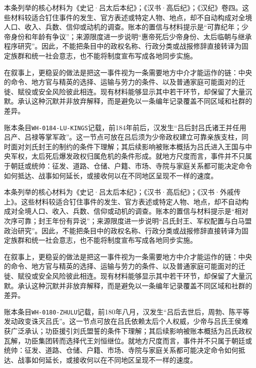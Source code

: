 本条列举的核心材料为《史记·吕太后本纪》；《汉书·高后纪》；《汉纪》卷四。这些材料较适合钉住事件的发生、官方表述或特定人物、地点，却不自动构成对全境人口、收入、兵数、信仰或动机的调查。账本的置信与材料提示是“可靠纪年；少帝身份和年龄有争议”；来源限度进一步说明“惠帝死后少帝身份、太后临朝与继承程序研究”。因此，不能把条目中的政权名称、行政分类或战报修辞直接转译为固定族群和统一社会意志，也不能将制度宣布写成各地同步实施。

在叙事上，更稳妥的做法是把这一事件视为一条需要地方中介才能运作的链：中央的命令、地方官与精英的选择、运输与劳力的条件、以及普通家庭可能面对的迁徙、赋役或安全风险彼此相连。现有材料能够显示其中若干环节，却保留了大量沉默。承认这种沉默并非放弃解释，而是避免以一条编年记录覆盖不同区域和社群的差异。

账本条目\texttt{WH-0184-LU-KINGS}记载，前184年前后，汉发生“吕后封吕氏诸王并任用吕产、吕禄等掌军政”。这一节点可放在吕后须为少帝政权建立可靠亲族支柱，同时面对刘氏封王的制约的条件下理解；其后续影响被账本概括为吕氏进入王国与中央军权，太后死后爆发政权归属危机的条件形成。就地方尺度而言，事件并不只属于朝廷或统帅：征发、道路、仓储、户籍、市场、寺院与家庭关系都可能决定命令如何抵达、战事如何延长，或接收何以在不同地区呈现不一样的速度。

本条列举的核心材料为《史记·吕太后本纪》；《汉书·高后纪》；《汉书·外戚传上》。这些材料较适合钉住事件的发生、官方表述或特定人物、地点，却不自动构成对全境人口、收入、兵数、信仰或动机的调查。账本的置信与材料提示是“相对次序可靠；封王年份有异说”；来源限度进一步说明“吕氏封王、军权配置与白马盟政治研究”。因此，不能把条目中的政权名称、行政分类或战报修辞直接转译为固定族群和统一社会意志，也不能将制度宣布写成各地同步实施。

在叙事上，更稳妥的做法是把这一事件视为一条需要地方中介才能运作的链：中央的命令、地方官与精英的选择、运输与劳力的条件、以及普通家庭可能面对的迁徙、赋役或安全风险彼此相连。现有材料能够显示其中若干环节，却保留了大量沉默。承认这种沉默并非放弃解释，而是避免以一条编年记录覆盖不同区域和社群的差异。

账本条目\texttt{WH-0180-ZHULU}记载，前180年八月，汉发生“吕后去世后，周勃、陈平等发动政变诛灭吕氏”。这一节点可放在吕氏依赖太后个人权威，少帝与吕氏王侯难获广泛承认；功臣援引刘氏盟誓的条件下理解；其后续影响被账本概括为吕氏政权瓦解，功臣集团转而选择代王刘恒继位。就地方尺度而言，事件并不只属于朝廷或统帅：征发、道路、仓储、户籍、市场、寺院与家庭关系都可能决定命令如何抵达、战事如何延长，或接收何以在不同地区呈现不一样的速度。

